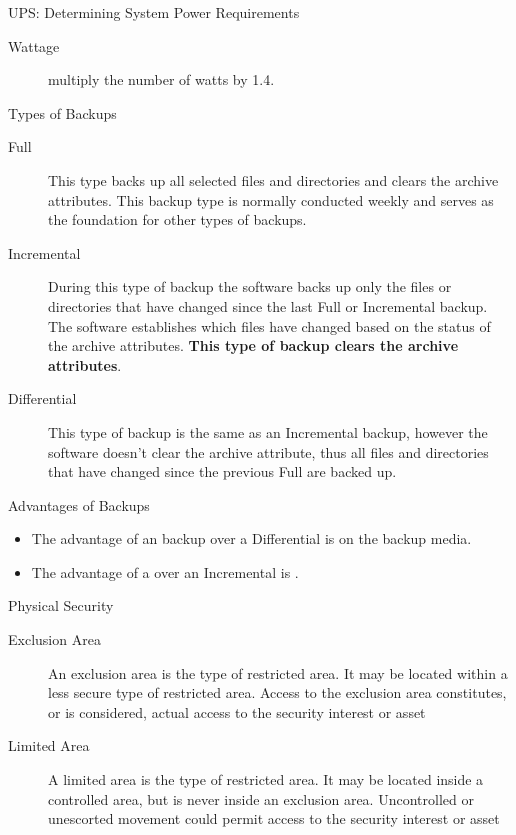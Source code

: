 \documentclass[landscape,fontscale=1,margin=0.2cm,paperwidth=70truecm, paperheight=40truecm,debug]{baposter}
\begin{document}
\begin{poster}
\begin{posterbox}[column=3,below=auto,textborder=rounded]{UPS: Determining System Power Requirements}
\begin{description}
\item[Wattage] multiply the number of watts by 1.4.
\end{description}
\end{posterbox}
\begin{posterbox}[column=3,below=auto]{Types of Backups}
\begin{description}
\item[Full] This type backs up all selected files and directories and clears the archive attributes. This backup type is normally conducted weekly and serves as the foundation for other types of backups.
\item[Incremental] During this type of backup the software backs up only the files or directories that have changed since the last Full or Incremental backup. The software establishes which files have changed based on the status of the archive attributes. \textbf{This type of backup clears the archive attributes}.
\item[Differential] This type of backup is the same as an Incremental backup, however the software doesn't clear the archive attribute, thus all files and directories that have changed since the previous Full are backed up.
\end{description}
\end{posterbox}
\begin{posterbox}[column=3,below=auto,textborder=rounded]{Advantages of Backups}
\begin{itemize}
\item The advantage of an \textbf{\color{orange}{Incremental}} backup over a Differential is \textbf{\color{orange}{less space used}} on the backup media.
\item The advantage of a \textbf{\color{orange}{Differential}} over an Incremental is \textbf{\color{orange}{faster restoration time}}.
\end{itemize}
\end{posterbox}
\begin{posterbox}[column=3,below=auto]{Physical Security}
\begin{description}
\item[Exclusion Area] An exclusion area is the \textbf{\color{orange}{most secure}} type of restricted area. It may be located within a less secure type of restricted area. Access to the exclusion area constitutes, or is considered, actual access to the security interest or asset
\item[Limited Area] A limited area is the \textbf{\color{orange}{second most secure}} type of restricted area. It may be located inside a controlled area, but is never inside an exclusion area. Uncontrolled or unescorted movement could permit access to the security interest or asset

\end{description}
\end{posterbox}
\end{poster}
\end{document}
